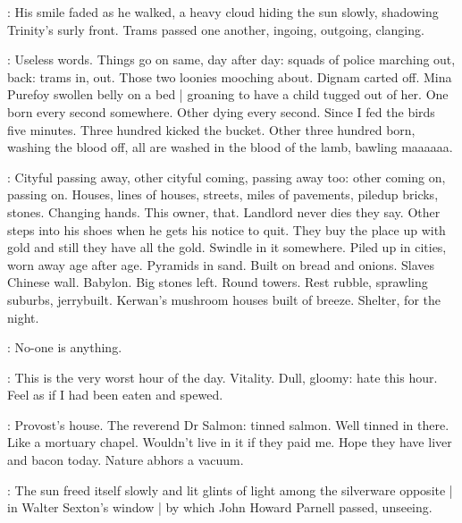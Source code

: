 :
His smile faded as he walked,
a heavy cloud hiding the sun slowly,
shadowing Trinity's surly front.
Trams passed one another,
ingoing,
outgoing,
clanging.

\BloomInt:
Useless words.
Things go on same,
day after day:
squads of police marching out,
back:
trams in,
out.
Those two loonies mooching about.
Dignam carted off.
Mina Purefoy swollen belly on a bed |
groaning to have a child tugged out of her.
One born every second somewhere.
Other dying every second.
Since I fed the birds five minutes.
Three hundred kicked the bucket.
Other three hundred born,
washing the blood off,
all are washed in the blood of the lamb,
bawling maaaaaa.

\BloomInt:
Cityful passing away,
other cityful coming,
passing away too:
other coming on,
passing on.
Houses, lines of houses,
streets,
miles of pavements,
piledup bricks,
stones.
Changing hands.
This owner,
that.
Landlord never dies they say.
Other steps into his shoes when he gets his notice to quit.
They buy the place up with gold and still they have all the gold.
Swindle in it somewhere.
Piled up in cities,
worn away age after age.
Pyramids in sand.
Built on bread and onions.
Slaves Chinese wall.
Babylon.
Big stones left.
Round towers.
Rest rubble,
sprawling suburbs,
jerrybuilt.
Kerwan's mushroom houses built of breeze.
Shelter,
for the night.

\BloomInt:
No-one is anything.

\BloomInt:
This is the very worst hour of the day.
Vitality.
Dull, gloomy:
hate this hour.
Feel as if I had been eaten and spewed.

\BloomInt:
Provost's house.
The reverend Dr Salmon:
tinned salmon.
Well tinned in there.
Like a mortuary chapel.
Wouldn't live in it if they paid me.
Hope they have liver and bacon today.
Nature abhors a vacuum.

:
The sun freed itself slowly
and lit glints of light among the silverware opposite |
in Walter Sexton's window |
by which John Howard Parnell passed,
unseeing.


